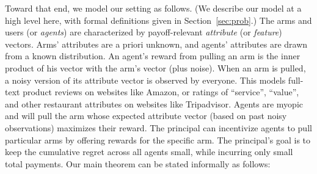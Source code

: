 Toward that end, we model our setting as follows.
(We describe our model at a high level here,
with formal definitions given in Section~\ref{sec:prob}.)
The \ARMNUM arms and users (or \emph{agents})
are characterized by payoff-relevant
\emph{attribute} (or \emph{feature}) vectors.
Arms' attributes are a priori unknown,
and agents' attributes are drawn from a known distribution.
An agent's reward from pulling an arm is the inner product of his
vector with the arm's vector (plus noise).
When an arm is pulled, a noisy version of its attribute vector is
observed by everyone.
This models full-text product reviews on websites like Amazon,
or ratings of ``service'', ``value'',
and other restaurant attributes on websites like Tripadvisor.  
Agents are myopic and will pull the arm whose expected attribute
vector (based on past noisy observations) maximizes their reward.
The principal can incentivize agents to pull particular arms by
offering rewards for the specific arm.
The principal's goal is to keep the cumulative regret across all
agents small, while incurring only small total payments.
Our main theorem can be stated informally as follows:



